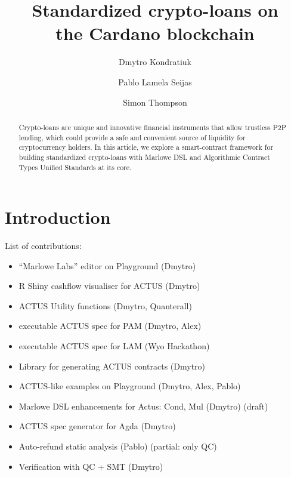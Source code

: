 \documentclass[runningheads]{llncs}
\begin{document}
\title{Standardized crypto-loans on\\ the Cardano blockchain}%


\author{Dmytro Kondratiuk \and
				Pablo {Lamela Seijas} \and
                Simon Thompson}





%
\maketitle              %
%
\begin{abstract}
Crypto-loans are unique and innovative financial instruments that
allow trustless P2P lending, which could provide a safe and convenient
source of liquidity for cryptocurrency holders. In this article, we
explore a smart-contract framework for building standardized crypto-loans
with Marlowe DSL and Algorithmic Contract Types Unified Standards
at its core.

\end{abstract}


\section{Introduction}

List of contributions:
\begin{itemize}
\item \textquotedblleft Marlowe Labs\textquotedblright{} editor on Playground
(Dmytro) 
\item R Shiny cashflow visualiser for ACTUS (Dmytro) 
\item ACTUS Utility functions (Dmytro, Quanterall) 
\item executable ACTUS spec for PAM (Dmytro, Alex) 
\item executable ACTUS spec for LAM (Wyo Hackathon) 
\item Library for generating ACTUS contracts (Dmytro) 
\item ACTUS-like examples on Playground (Dmytro, Alex, Pablo) 
\item Marlowe DSL enhancements for Actus: Cond, Mul (Dmytro) (draft) 
\item ACTUS spec generator for Agda (Dmytro) 
\item Auto-refund static analysis (Pablo) (partial: only QC) 
\item Verification with QC + SMT (Dmytro) 
\end{itemize}
\end{document}
